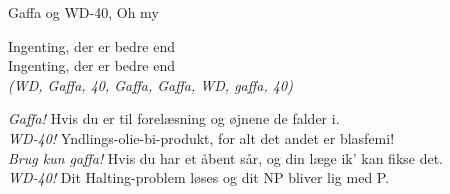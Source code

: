 \begin{song}{Gaffa og WD-40, Oh my}
  \begin{SBSection*}
    Ingenting, der er bedre end\\
    Ingenting, der er bedre end\\
    \emph{(WD, Gaffa, 40, Gaffa, Gaffa, WD, gaffa, 40)}
  \end{SBSection*}

  \begin{SBChorus}
    \emph{Gaffa!} Hvis du er til forelæsning og øjnene de falder i.\\
    \emph{WD-40!} Yndlings-olie-bi-produkt, for alt det andet er blasfemi!\\
    \emph{Brug kun gaffa!} Hvis du har et åbent sår, og din læge ik’ kan fikse det.\\
    \emph{WD-40!} Dit Halting-problem løses og dit NP bliver lig med P.
  \end{SBChorus}
\end{song}